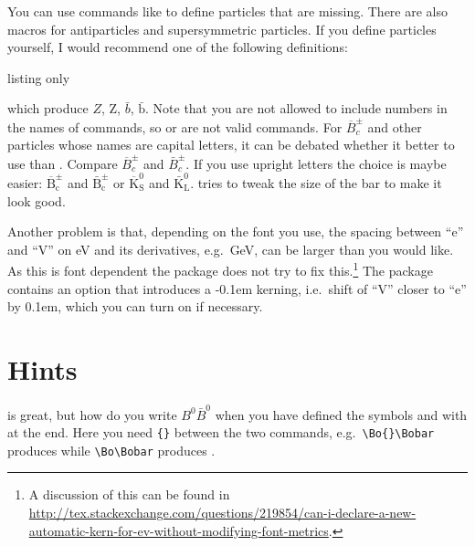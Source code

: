 You can use commands like  to define particles that are missing.
There are also macros for antiparticles and supersymmetric particles.
If you define particles yourself,
I would recommend one of the following definitions:
\begin{tcblisting}{listing only}
\newcommand*{\Zo}{\ensuremath{Z}\xspace}
\newcommand*{\Zo}{\ensuremath{\text{Z}}\xspace}
\newcommand*{\bbarQ}{\ensuremath{\bar{b}}\xspace}
\newcommand*{\bbarQ}{\ensuremath{\bar{\text{b}}}\xspace}
\end{tcblisting}
\noindent
which produce \ensuremath{Z}, \ensuremath{\text{Z}},
\ensuremath{\bar{b}}, \ensuremath{\bar{\text{b}}}. Note that you are
not allowed to include numbers in the names of commands, so
 or  are not valid commands.
For \(\overline{B}^{\pm}_{c}\) and other particles whose names are capital
letters, it can be debated whether it better to use
 than .
Compare \(\overline{B}^{\pm}_{c}\) and \(\bar{B}^{\pm}_{c}\).
If you use upright letters the choice is maybe
easier: \(\overline{\text{B}}^{\pm}_{\text{c}}\) and
\(\bar{\text{B}}^{\pm}_{\text{c}}\) or
\(\overline{\text{K}}^{0}_{\text{S}}\) and
\(\bar{\text{K}}^{0}_{\text{L}}\).
 tries to tweak the size of the bar to make it look good.

Another problem is that, depending on the font you use, the spacing between \enquote{e} and \enquote{V}
on \unit{\eV} and its derivatives, e.g.\ \unit{\GeV}, can be larger than you would like.
As this is font dependent the  package does not try to fix this.\footnote{%
A discussion of this can be found in
\url{http://tex.stackexchange.com/questions/219854/can-i-declare-a-new-automatic-kern-for-ev-without-modifying-font-metrics}.}
The  package contains an option  that introduces a -0.1em kerning,
i.e.\ shift of \enquote{V} closer to \enquote{e} by 0.1em, which you can turn on if necessary.


\section{Hints}%
\label{sec:tips:hints}

 is great, but how do you write \(B^{0}\bar{B}^{0}\) when
you have defined the symbols  and  with
 at the end. Here you need \verb+{}+ between the two
commands, e.g.\ \verb+\Bo{}\Bobar+ produces \Bo{}\Bobar while
\verb+\Bo\Bobar+ produces \Bo\Bobar.

